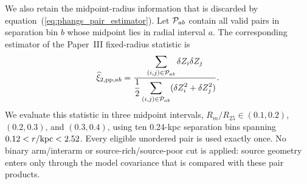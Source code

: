 \documentclass[fleqn,usenatbib]{mnras}
\begin{document}
We also retain the midpoint-radius information that is discarded by equation~(\ref{eq:phangs_pair_estimator}).  Let ${\cal P}_{ab}$ contain all valid pairs in separation bin $b$ whose midpoint lies in radial interval $a$.  The corresponding estimator of the Paper~III fixed-radius statistic is
\begin{equation}
    \widehat\xi_{2,{\rm pp},ab}=
    \frac{\displaystyle
    \sum_{(i,j)\in{\cal P}_{ab}}\delta Z_i\delta Z_j}
    {\displaystyle\frac{1}{2}
    \sum_{(i,j)\in{\cal P}_{ab}}
    (\delta Z_i^2+\delta Z_j^2)}.
    \label{eq:phangs_xi2_pp_estimator}
\end{equation}
We evaluate this statistic in three midpoint intervals, $R_m/R_{25}\in(0.1,0.2)$, $(0.2,0.3)$, and $(0.3,0.4)$, using ten 0.24-kpc separation bins spanning $0.12<r/{\rm kpc}<2.52$.  Every eligible unordered pair is used exactly once.  No binary arm/interarm or source-rich/source-poor cut is applied: source geometry enters only through the model covariance that is compared with these pair products.
\end{document}
